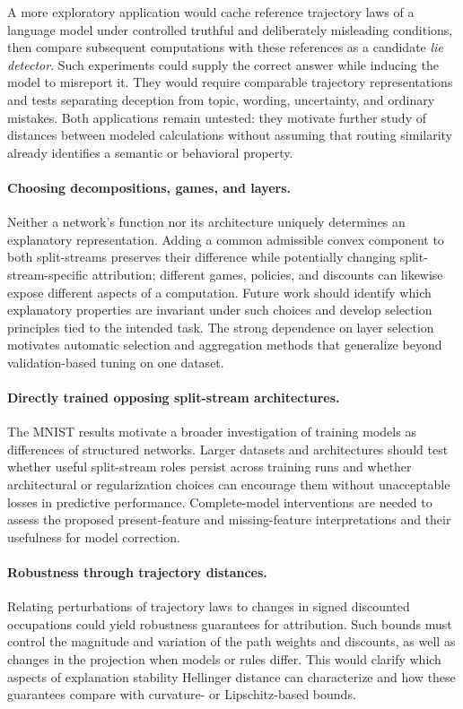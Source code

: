 A more exploratory application would cache reference trajectory laws of a language model under controlled truthful and deliberately misleading conditions, then compare subsequent computations with these references as a candidate \emph{lie detector}. Such experiments could supply the correct answer while inducing the model to misreport it. They would require comparable trajectory representations and tests separating deception from topic, wording, uncertainty, and ordinary mistakes. Both applications remain untested: they motivate further study of distances between modeled calculations without assuming that routing similarity already identifies a semantic or behavioral property.

\paragraph{Choosing decompositions, games, and layers.}
Neither a network's function nor its architecture uniquely determines an explanatory representation. Adding a common admissible convex component to both split-streams preserves their difference while potentially changing split-stream-specific attribution; different games, policies, and discounts can likewise expose different aspects of a computation. Future work should identify which explanatory properties are invariant under such choices and develop selection principles tied to the intended task. The strong dependence on layer selection motivates automatic selection and aggregation methods that generalize beyond validation-based tuning on one dataset.

\paragraph{Directly trained opposing split-stream architectures.}
The MNIST results motivate a broader investigation of training models as differences of structured networks. Larger datasets and architectures should test whether useful split-stream roles persist across training runs and whether architectural or regularization choices can encourage them without unacceptable losses in predictive performance. Complete-model interventions are needed to assess the proposed present-feature and missing-feature interpretations and their usefulness for model correction.

\paragraph{Robustness through trajectory distances.}
Relating perturbations of trajectory laws to changes in signed discounted occupations could yield robustness guarantees for attribution. Such bounds must control the magnitude and variation of the path weights and discounts, as well as changes in the projection when models or rules differ. This would clarify which aspects of explanation stability Hellinger distance can characterize and how these guarantees compare with curvature- or Lipschitz-based bounds.

